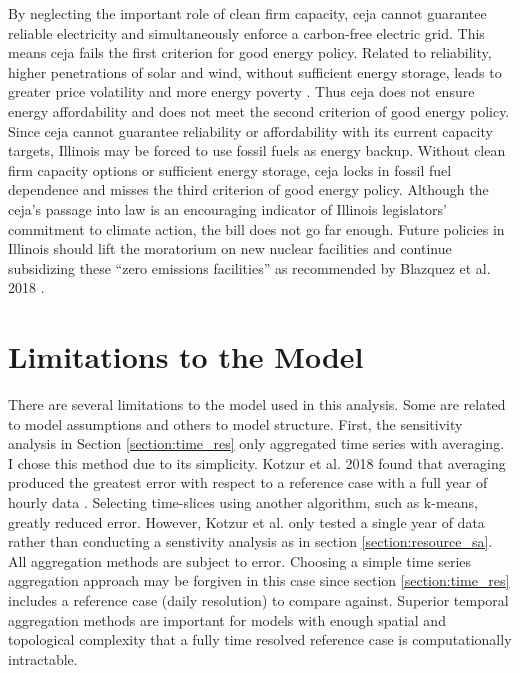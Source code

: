 By neglecting the important role of clean firm capacity, \gls{ceja} cannot guarantee
reliable electricity and simultaneously enforce a carbon-free electric grid. This
means \gls{ceja} fails the first criterion for good energy policy. Related to reliability,
higher penetrations of solar and wind, without sufficient energy storage, leads to
greater price volatility \cite{winkler_impact_2016, blazquez_renewable_2018} and
more energy poverty \cite{henry_how_2021}. Thus \gls{ceja} does not ensure energy
affordability and does not meet the second criterion of good energy policy. Since
\gls{ceja} cannot guarantee reliability or affordability with its current capacity
targets, Illinois may be forced to use fossil fuels as energy backup. Without
clean firm capacity options or sufficient energy storage, \gls{ceja} locks in
fossil fuel dependence and misses the third criterion of good energy policy.
Although the \gls{ceja}'s passage into law is an encouraging indicator of Illinois
legislators' commitment to climate action, the bill does not go far enough. Future
policies in Illinois should lift the moratorium on new nuclear facilities and
continue subsidizing these ``zero emissions facilities'' as recommended by
Blazquez et al. 2018 \cite{blazquez_renewable_2018}.

\section{Limitations to the Model}

There are several limitations to the model used in this analysis. Some are related
to model assumptions and others to model structure. First, the sensitivity analysis
in Section \ref{section:time_res} only aggregated time series with averaging. I
chose this method due to its simplicity. Kotzur et al. 2018 found that averaging
produced the greatest error with respect to a reference case with a full year of
hourly data \cite{kotzur_impact_2018}. Selecting time-slices using another algorithm,
such as k-means, greatly reduced error. However, Kotzur et al. only tested a single
year of data rather than conducting a senstivity analysis as in section
\ref{section:resource_sa}. All aggregation methods are subject to error. Choosing
a simple time series aggregation approach may be forgiven in this case since section
\ref{section:time_res} includes a reference case (daily resolution) to compare against.
Superior temporal aggregation methods are important for models with enough
spatial and topological complexity that a fully time resolved reference case is
computationally intractable.

